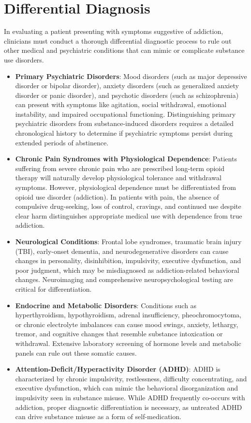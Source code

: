 \section*{Differential Diagnosis}
In evaluating a patient presenting with symptoms suggestive of addiction, clinicians must conduct a thorough differential diagnostic process to rule out other medical and psychiatric conditions that can mimic or complicate substance use disorders.
\begin{itemize}
    \item \textbf{Primary Psychiatric Disorders}: Mood disorders (such as major depressive disorder or bipolar disorder), anxiety disorders (such as generalized anxiety disorder or panic disorder), and psychotic disorders (such as schizophrenia) can present with symptoms like agitation, social withdrawal, emotional instability, and impaired occupational functioning. Distinguishing primary psychiatric disorders from substance-induced disorders requires a detailed chronological history to determine if psychiatric symptoms persist during extended periods of abstinence.
    \item \textbf{Chronic Pain Syndromes with Physiological Dependence}: Patients suffering from severe chronic pain who are prescribed long-term opioid therapy will naturally develop physiological tolerance and withdrawal symptoms. However, physiological dependence must be differentiated from opioid use disorder (addiction). In patients with pain, the absence of compulsive drug-seeking, loss of control, cravings, and continued use despite clear harm distinguishes appropriate medical use with dependence from true addiction.
    \item \textbf{Neurological Conditions}: Frontal lobe syndromes, traumatic brain injury (TBI), early-onset dementia, and neurodegenerative disorders can cause changes in personality, disinhibition, impulsivity, executive dysfunction, and poor judgment, which may be misdiagnosed as addiction-related behavioral changes. Neuroimaging and comprehensive neuropsychological testing are critical for differentiation.
    \item \textbf{Endocrine and Metabolic Disorders}: Conditions such as hyperthyroidism, hypothyroidism, adrenal insufficiency, pheochromocytoma, or chronic electrolyte imbalances can cause mood swings, anxiety, lethargy, tremor, and cognitive changes that resemble substance intoxication or withdrawal. Extensive laboratory screening of hormone levels and metabolic panels can rule out these somatic causes.
    \item \textbf{Attention-Deficit/Hyperactivity Disorder (ADHD)}: ADHD is characterized by chronic impulsivity, restlessness, difficulty concentrating, and executive dysfunction, which can mimic the behavioral disorganization and impulsivity seen in substance misuse. While ADHD frequently co-occurs with addiction, proper diagnostic differentiation is necessary, as untreated ADHD can drive substance misuse as a form of self-medication.

\end{itemize}
